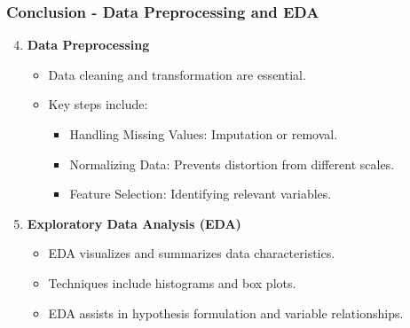 \documentclass[aspectratio=169]{beamer}
\begin{document}
\begin{frame}[fragile]
    \frametitle{Conclusion - Data Preprocessing and EDA}
    \begin{enumerate}
        \setcounter{enumi}{3}
        \item \textbf{Data Preprocessing}
        \begin{itemize}
            \item Data cleaning and transformation are essential.
            \item Key steps include:
            \begin{itemize}
                \item Handling Missing Values: Imputation or removal.
                \item Normalizing Data: Prevents distortion from different scales.
                \item Feature Selection: Identifying relevant variables.
            \end{itemize}
        \end{itemize}

        \item \textbf{Exploratory Data Analysis (EDA)}
        \begin{itemize}
            \item EDA visualizes and summarizes data characteristics.
            \item Techniques include histograms and box plots.
            \item EDA assists in hypothesis formulation and variable relationships.
        \end{itemize}
    \end{enumerate}
\end{frame}
\end{document}
